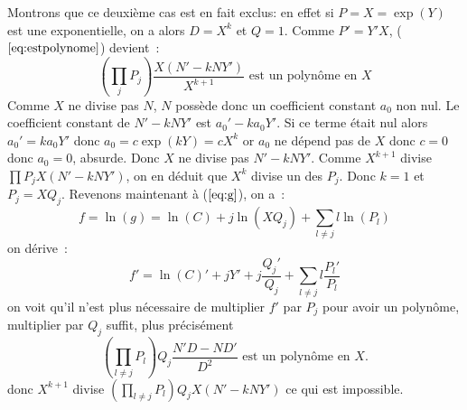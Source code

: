 \documentclass[a4paper,11pt]{book}
\begin{document}
\begin{giacjshere}
Montrons que ce deuxième cas est en fait exclus:
en effet si $P=X=\exp(Y)$ est une exponentielle, on a alors 
$D=X^k$ et $Q=1$.
Comme $P'=Y'X$, (\(\ref{eq:estpolynome}\)) devient~:
\[ \left( \prod_j P_j \right) \frac{X (N' - k N Y' )}{X^{k+1}}
\mbox{ est un polynôme en $X$} \]
Comme $X$ ne divise pas $N$, $N$ possède donc un coefficient constant 
$a_0$ non nul. Le coefficient constant de $N'-kNY'$ est $a_0'-ka_0 Y'$. 
Si ce terme était nul alors $a_0'=ka_0 Y'$ donc $a_0=c \exp(kY)=cX^k$ 
or $a_0$ ne dépend pas de $X$ donc $c=0$ donc $a_0=0$, absurde. 
Donc $X$ ne divise pas $N'-kNY'$.
Comme $X^{k+1}$ divise $ \prod P_j X (N' - k N Y' )$, on en déduit que
$X^k$ divise un des $P_j$. Donc $k=1$ et $P_j=XQ_j$. 
Revenons maintenant à (\(\ref{eq:g}\)), on a~:
\[  f=\ln(g) = \ln(C)+j \ln(XQ_j)+ \sum_{l \neq j} l \ln(P_l) \]
on dérive~:
\[ f'=\ln(C)'+jY'+j\frac{Q_j'}{Q_j}+\sum_{l \neq j} l \frac{P_l'}{P_l}\]
on voit qu'il n'est plus nécessaire de multiplier $f'$ par $P_j$
pour avoir un polynôme, multiplier par $Q_j$ suffit, plus précisément
\[ 
\left( \prod_{l \neq j} P_l \right) Q_j \frac{N' D - N D'}{D^2} 
\mbox{ est un polynôme en $X$.} 
\]
donc $X^{k+1}$ divise  
$ \left(\prod_{l \neq j}P_l \right) Q_j X (N' - k N Y' )$ 
ce qui est impossible.


\end{giacjshere}
\end{document}

